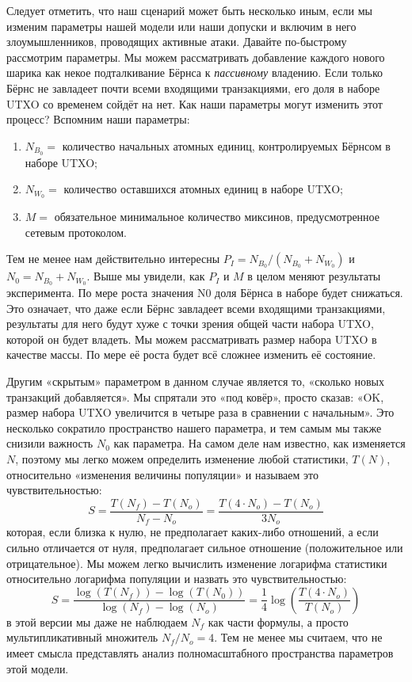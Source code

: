 \documentclass{mrl}
\begin{document}
Следует отметить, что наш сценарий может быть несколько иным, если мы изменим параметры нашей модели или наши допуски и включим в него злоумышленников, проводящих активные атаки. Давайте по-быстрому рассмотрим параметры. Мы можем рассматривать добавление каждого нового шарика как некое подталкивание Бёрнса к \emph{пассивному} владению. Если только Бёрнс не завладеет почти всеми входящими транзакциями, его доля в наборе UTXO со временем сойдёт на нет. Как наши параметры могут изменить этот процесс? Вспомним наши параметры:
\begin{enumerate}
\item $N_{B_0} = $ количество начальных атомных единиц, контролируемых Бёрнсом в наборе UTXO;
\item $N_{W_0} = $ количество оставшихся атомных единиц в наборе UTXO;
\item $M = $ обязательное минимальное количество миксинов, предусмотренное сетевым протоколом.
\end{enumerate}
Тем не менее нам действительно интересны $P_I = N_{B_0}/(N_{B_0} + N_{W_0})$ и $N_0 = N_{B_0} + N_{W_0}$. Выше мы увидели, как $P_I$ и $M$ в целом меняют результаты эксперимента. По мере роста значения N0 доля Бёрнса в наборе будет снижаться. Это означает, что даже если Бёрнс завладеет всеми входящими транзакциями, результаты для него будут хуже с точки зрения общей части набора UTXO, которой он будет владеть. Мы можем рассматривать размер набора UTXO в качестве массы. По мере её роста будет всё сложнее изменить её состояние.

Другим «скрытым» параметром в данном случае является то, «сколько новых транзакций добавляется». Мы спрятали это «под ковёр», просто сказав: «OK, размер набора UTXO увеличится в четыре раза в сравнении с начальным». Это несколько сократило пространство нашего параметра, и тем самым мы также снизили важность $N_0$ как параметра. На самом деле нам известно, как изменяется $N$, поэтому мы легко можем определить изменение любой статистики, $T(N)$, относительно «изменения величины популяции» и называем это чувствительностью:
\[S = \frac{T(N_f) - T(N_o)}{N_f - N_o} = \frac{T(4\cdot N_o) - T(N_o)}{3N_o}\]
которая, если близка к нулю, не предполагает каких-либо отношений, а если сильно отличается от нуля, предполагает сильное отношение (положительное или отрицательное). Мы можем легко вычислить изменение логарифма статистики относительно логарифма популяции и назвать это чувствительностью:
\[S = \frac{\log(T(N_f)) - \log(T(N_0))}{\log(N_f)-\log(N_o)} = \frac{1}{4}\log\left(\frac{T(4\cdot N_o)}{T(N_o)}\right)\]
в этой версии мы даже не наблюдаем $N_f$ как части формулы, а просто мультипликативный множитель $N_f/N_o = 4$. Тем не менее мы считаем, что не имеет смысла представлять анализ полномасштабного пространства параметров этой модели.
\end{document}
